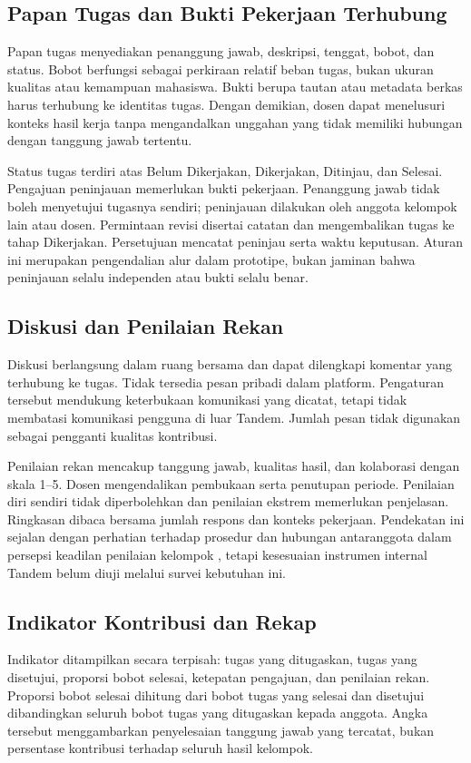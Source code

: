 \documentclass[12pt,a4paper,oneside]{report}
\begin{document}
\subsection{Papan Tugas dan Bukti Pekerjaan Terhubung}
Papan tugas menyediakan penanggung jawab, deskripsi, tenggat, bobot, dan status. Bobot berfungsi sebagai perkiraan relatif beban tugas, bukan ukuran kualitas atau kemampuan mahasiswa. Bukti berupa tautan atau metadata berkas harus terhubung ke identitas tugas. Dengan demikian, dosen dapat menelusuri konteks hasil kerja tanpa mengandalkan unggahan yang tidak memiliki hubungan dengan tanggung jawab tertentu.

Status tugas terdiri atas Belum Dikerjakan, Dikerjakan, Ditinjau, dan Selesai. Pengajuan peninjauan memerlukan bukti pekerjaan. Penanggung jawab tidak boleh menyetujui tugasnya sendiri; peninjauan dilakukan oleh anggota kelompok lain atau dosen. Permintaan revisi disertai catatan dan mengembalikan tugas ke tahap Dikerjakan. Persetujuan mencatat peninjau serta waktu keputusan. Aturan ini merupakan pengendalian alur dalam prototipe, bukan jaminan bahwa peninjauan selalu independen atau bukti selalu benar.

\subsection{Diskusi dan Penilaian Rekan}
Diskusi berlangsung dalam ruang bersama dan dapat dilengkapi komentar yang terhubung ke tugas. Tidak tersedia pesan pribadi dalam platform. Pengaturan tersebut mendukung keterbukaan komunikasi yang dicatat, tetapi tidak membatasi komunikasi pengguna di luar Tandem. Jumlah pesan tidak digunakan sebagai pengganti kualitas kontribusi.

Penilaian rekan mencakup tanggung jawab, kualitas hasil, dan kolaborasi dengan skala 1--5. Dosen mengendalikan pembukaan serta penutupan periode. Penilaian diri sendiri tidak diperbolehkan dan penilaian ekstrem memerlukan penjelasan. Ringkasan dibaca bersama jumlah respons dan konteks pekerjaan. Pendekatan ini sejalan dengan perhatian terhadap prosedur dan hubungan antaranggota dalam persepsi keadilan penilaian kelompok \citep{rasooli2025}, tetapi kesesuaian instrumen internal Tandem belum diuji melalui survei kebutuhan ini.

\subsection{Indikator Kontribusi dan Rekap}
Indikator ditampilkan secara terpisah: tugas yang ditugaskan, tugas yang disetujui, proporsi bobot selesai, ketepatan pengajuan, dan penilaian rekan. Proporsi bobot selesai dihitung dari bobot tugas yang selesai dan disetujui dibandingkan seluruh bobot tugas yang ditugaskan kepada anggota. Angka tersebut menggambarkan penyelesaian tanggung jawab yang tercatat, bukan persentase kontribusi terhadap seluruh hasil kelompok.
\end{document}
